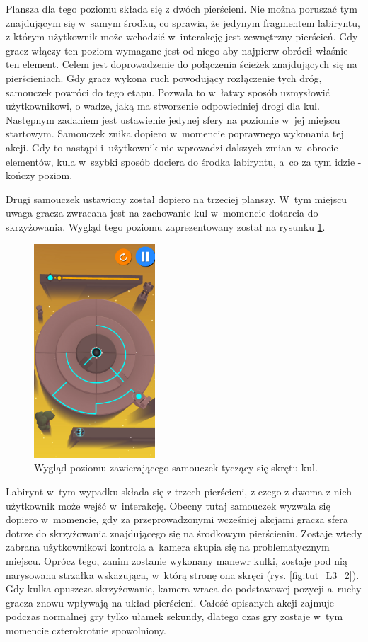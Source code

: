 \documentclass[a4paper,12pt,numbers=noenddot]{report}
\begin{document}
Plansza dla tego poziomu składa się z dwóch pierścieni. Nie można poruszać tym znajdującym się w~samym środku, co sprawia, że jedynym fragmentem labiryntu, z którym użytkownik może wchodzić w~interakcję jest zewnętrzny pierścień.
Gdy gracz włączy ten poziom wymagane jest od niego aby najpierw obrócił właśnie ten element. Celem jest doprowadzenie do połączenia ścieżek znajdujących się na pierścieniach. Gdy gracz wykona ruch powodujący rozłączenie tych dróg, samouczek powróci do tego etapu. Pozwala to w~łatwy sposób uzmysłowić użytkownikowi, o wadze, jaką ma stworzenie odpowiedniej drogi dla kul. 
Następnym zadaniem jest ustawienie jedynej sfery na poziomie w~jej miejscu startowym. Samouczek znika dopiero w~momencie poprawnego wykonania tej akcji. Gdy to nastąpi i~użytkownik nie wprowadzi dalszych zmian w~obrocie elementów, kula w~szybki sposób dociera do środka labiryntu, a~co za tym idzie - kończy poziom.

Drugi samouczek ustawiony został dopiero na trzeciej planszy. W~tym miejscu uwaga gracza zwracana jest na zachowanie kul w~momencie dotarcia do skrzyżowania. Wygląd tego poziomu zaprezentowany został na rysunku \ref{fig:tut_L3_1}. 
\begin{figure}[h!]
	\centering
  	\includegraphics[height=8cm]{fig/l3.jpg}
	\caption{Wygląd poziomu zawierającego samouczek tyczący się skrętu kul.}
	\label{fig:tut_L3_1}
\end{figure}
Labirynt w~tym wypadku składa się z trzech pierścieni, z czego z dwoma z nich użytkownik może wejść w~interakcję. Obecny tutaj samouczek wyzwala się dopiero w~momencie, gdy za przeprowadzonymi wcześniej akcjami gracza sfera dotrze do skrzyżowania znajdującego się na środkowym pierścieniu. Zostaje wtedy zabrana użytkownikowi kontrola a~kamera skupia się na problematycznym miejscu. Oprócz tego, zanim zostanie wykonany manewr kulki, zostaje pod nią narysowana strzałka wskazująca, w~którą stronę ona skręci (rys. \ref{fig:tut_L3_2}). Gdy kulka opuszcza skrzyżowanie, kamera wraca do podstawowej pozycji a~ruchy gracza znowu wpływają na układ pierścieni. Całość opisanych akcji zajmuje podczas normalnej gry tylko ułamek sekundy, dlatego czas gry zostaje w~tym momencie czterokrotnie spowolniony. 
\end{document}
